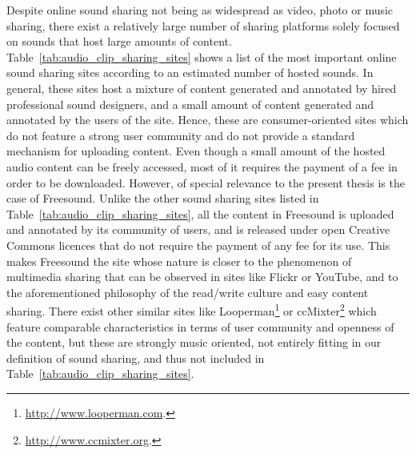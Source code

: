 Despite online sound sharing not being as widespread as video, photo or music sharing, there exist a relatively large number of sharing platforms solely focused on sounds that host large amounts of content.
Table~\ref{tab:audio_clip_sharing_sites} shows a list of the most important online sound sharing sites according to an estimated number of hosted sounds. In general, these sites host a mixture of content generated and annotated by hired professional sound designers, and a small amount of content generated and annotated by the users of the site. Hence, these are consumer-oriented sites which do not feature a strong user community and do not provide a standard mechanism for uploading content. Even though a small amount of the hosted audio content can be freely accessed, most of it requires the payment of a fee in order to be downloaded.
However, of special relevance to the present thesis is the case of Freesound. Unlike the other sound sharing sites listed in Table~\ref{tab:audio_clip_sharing_sites}, all the content in Freesound is uploaded and annotated by its community of users, and is released under open Creative Commons licences that do not require the payment of any fee for its use. This makes Freesound the site whose nature is closer to the phenomenon of multimedia sharing that can be observed in sites like Flickr or YouTube, and to the aforementioned philosophy of the read/write culture and easy content sharing. There exist other similar sites like Looperman\footnote{\url{http://www.looperman.com}.} or ccMixter\footnote{\url{http://www.ccmixter.org}.} which feature comparable characteristics in terms of user community and openness of the content, but these are strongly music oriented, not entirely fitting in our definition of sound sharing, and thus not included in Table~\ref{tab:audio_clip_sharing_sites}.

